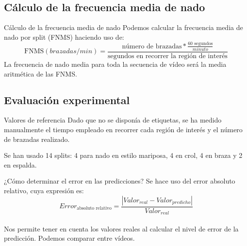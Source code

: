 \documentclass[11pt]{beamer}
\begin{document}
        \subsection{Cálculo de la frecuencia media de nado}
        \begin{frame}{Cálculo de la frecuencia media de nado}
            Podemos calcular la frecuencia media de nado por split (FNMS) haciendo uso de:
            \begin{equation}
                \text{FNMS} (brazadas/min) = \frac{ \text{número de brazadas} * \frac{\text{60 segundos}}{minuto} }{ \text{segundos en recorrer la región de interés}}
            \end{equation}
            La frecuencia de nado media para toda la secuencia de vídeo será la media aritmética de las FNMS.
        \end{frame} 
        
        \subsection*{Evaluación experimental}
        \begin{frame}{Valores de referencia} 
            Dado que no se disponía de etiquetas, se ha medido manualmente el tiempo empleado en recorrer cada región de interés y el número de brazadas realizado.
            
            Se han usado 14 splits: 4 para nado en estilo mariposa, 4 en crol, 4 en braza y 2 en espalda.
        \end{frame}
        
        \begin{frame}{¿Cómo determinar el error en las predicciones?}
            Se hace uso del error absoluto relativo, cuya expresión es: \\
            \begin{equation}
                Error_{\text{absoluto relativo}} = \frac{|Valor_{real} - Valor_{predicho}|}{Valor_{real}}
            \end{equation}
            \\Nos permite tener en cuenta los valores reales al calcular el nivel de error de la predicción. Podemos comparar entre vídeos.
        \end{frame} 
\end{document}
